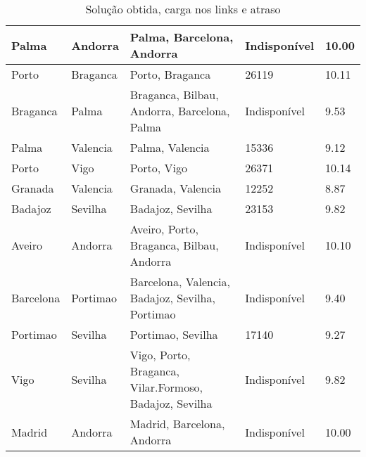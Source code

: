 \begin{table}[!htb]
{\begin{tabular}{|l|l|l|l|l|}
Palma & Andorra & Palma, Barcelona, Andorra & Indisponível & 10.00 \\ \hline
Porto & Braganca & Porto, Braganca & 26119 & 10.11 \\ \hline
Braganca & Palma & Braganca, Bilbau, Andorra, Barcelona, Palma & Indisponível & 9.53 \\ \hline
Palma & Valencia & Palma, Valencia & 15336 & 9.12 \\ \hline
Porto & Vigo & Porto, Vigo & 26371 & 10.14 \\ \hline
Granada & Valencia & Granada, Valencia & 12252 & 8.87 \\ \hline
Badajoz & Sevilha & Badajoz, Sevilha & 23153 & 9.82 \\ \hline
Aveiro & Andorra & Aveiro, Porto, Braganca, Bilbau, Andorra & Indisponível & 10.10 \\ \hline
Barcelona & Portimao & Barcelona, Valencia, Badajoz, Sevilha, Portimao & Indisponível & 9.40 \\ \hline
Portimao & Sevilha & Portimao, Sevilha & 17140 & 9.27 \\ \hline
Vigo & Sevilha & Vigo, Porto, Braganca, Vilar.Formoso, Badajoz, Sevilha & Indisponível & 9.82 \\ \hline
Madrid & Andorra & Madrid, Barcelona, Andorra & Indisponível & 10.00 \\ \hline
\end{tabular}}
\caption[]{Solução obtida, carga nos links e atraso}
\end{table}

